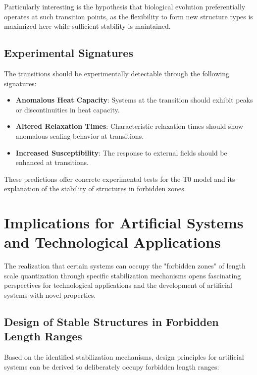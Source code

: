\documentclass[12pt,a4paper]{article}
\begin{document}
	Particularly interesting is the hypothesis that biological evolution preferentially operates at such transition points, as the flexibility to form new structure types is maximized here while sufficient stability is maintained.
	
	\subsection{Experimental Signatures}
	\label{subsec:experimentelle_signaturen}
	
	The transitions should be experimentally detectable through the following signatures:
	
	\begin{itemize}
		\item \textbf{Anomalous Heat Capacity}: Systems at the transition should exhibit peaks or discontinuities in heat capacity.
		
		\item \textbf{Altered Relaxation Times}: Characteristic relaxation times should show anomalous scaling behavior at transitions.
		
		\item \textbf{Increased Susceptibility}: The response to external fields should be enhanced at transitions.
	\end{itemize}
	
	These predictions offer concrete experimental tests for the T0 model and its explanation of the stability of structures in forbidden zones.
	
	\section{Implications for Artificial Systems and Technological Applications}
	\label{sec:technologische_anwendungen}
	
	The realization that certain systems can occupy the "forbidden zones" of length scale quantization through specific stabilization mechanisms opens fascinating perspectives for technological applications and the development of artificial systems with novel properties.
	
	\subsection{Design of Stable Structures in Forbidden Length Ranges}
	\label{subsec:design_stabile_strukturen}
	
	Based on the identified stabilization mechanisms, design principles for artificial systems can be derived to deliberately occupy forbidden length ranges:
	
\end{document}
